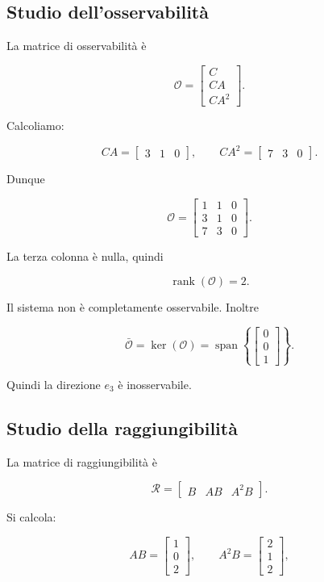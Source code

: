 \subsection{Studio dell'osservabilità}

La matrice di osservabilità è

\[
\mathcal O=
\begin{bmatrix}
C\\
CA\\
CA^2
\end{bmatrix}.
\]

Calcoliamo:

\[
CA=
\begin{bmatrix}
3 & 1 & 0
\end{bmatrix},
\qquad
CA^2=
\begin{bmatrix}
7 & 3 & 0
\end{bmatrix}.
\]

Dunque

\[
\mathcal O=
\begin{bmatrix}
1 & 1 & 0\\
3 & 1 & 0\\
7 & 3 & 0
\end{bmatrix}.
\]

La terza colonna è nulla, quindi

\[
\operatorname{rank}(\mathcal O)=2.
\]

Il sistema non è completamente osservabile.  
Inoltre

\[
\bar{\mathcal O}
=
\ker(\mathcal O)
=
\operatorname{span}\left\{
\begin{bmatrix}
0\\0\\1
\end{bmatrix}
\right\}.
\]

Quindi la direzione \(e_3\) è inosservabile.

\subsection{Studio della raggiungibilità}

La matrice di raggiungibilità è

\[
\mathcal R=
\begin{bmatrix}
B & AB & A^2B
\end{bmatrix}.
\]

Si calcola:

\[
AB=
\begin{bmatrix}
1\\0\\2
\end{bmatrix},
\qquad
A^2B=
\begin{bmatrix}
2\\1\\2
\end{bmatrix},
\]


